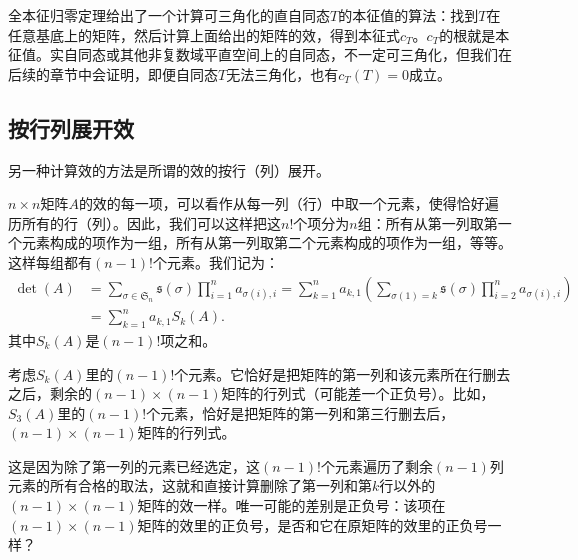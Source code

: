 \documentclass[12pt,UTF8]{ctexbook}
\begin{document}
全本征归零定理给出了一个计算可三角化的直自同态$T$的本征值的算法：找到$T$在任意基底上的矩阵，然后计算上面给出的矩阵的效，得到本征式$c_T$。$c_T$的根就是本征值。实自同态或其他非复数域平直空间上的自同态，不一定可三角化，但我们在后续的章节中会证明，即便自同态$T$无法三角化，也有$c_T(T) = 0$成立。

\subsection{按行列展开效}
另一种计算效的方法是所谓的效的按行（列）展开。

$n\times n$矩阵$A$的效的每一项，可以看作从每一列（行）中取一个元素，使得恰好遍历所有的行（列）。因此，我们可以这样把这$n!$个项分为$n$组：所有从第一列取第一个元素构成的项作为一组，所有从第一列取第二个元素构成的项作为一组，等等。这样每组都有$(n-1)!$个元素。我们记为：
\begin{align*}
    \det(A) &= \sum_{\sigma\in\mathfrak{S}_n} \mathfrak{s}(\sigma) \prod_{i=1}^n a_{\sigma(i),i} = \sum_{k=1}^n a_{k,1}\left( \sum_{\sigma(1)=k} \mathfrak{s}(\sigma) \prod_{i=2}^n a_{\sigma(i),i}\right) \\
    &= \sum_{k=1}^n a_{k,1} S_k(A).
\end{align*}
其中$S_k(A)$是$(n-1)!$项之和。

考虑$S_k(A)$里的$(n-1)!$个元素。它恰好是把矩阵的第一列和该元素所在行删去之后，剩余的$(n-1)\times (n-1)$矩阵的行列式（可能差一个正负号）。比如，$S_3(A)$里的$(n-1)!$个元素，恰好是把矩阵的第一列和第三行删去后，$(n-1)\times (n-1)$矩阵的行列式。

这是因为除了第一列的元素已经选定，这$(n-1)!$个元素遍历了剩余$(n-1)$列元素的所有合格的取法，这就和直接计算删除了第一列和第$k$行以外的$(n-1)\times (n-1)$矩阵的效一样。唯一可能的差别是正负号：该项在$(n-1)\times (n-1)$矩阵的效里的正负号，是否和它在原矩阵的效里的正负号一样？
\end{document}
